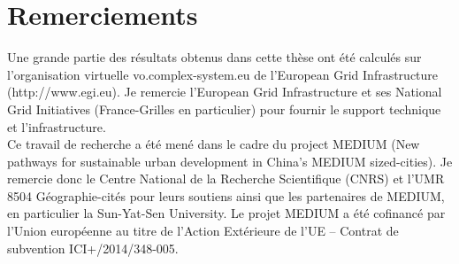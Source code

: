 




\begingroup

\let\clearpage\relax
\let\cleardoublepage\relax
\let\cleardoublepage\relax

\chapter*{Remerciements}




Une grande partie des résultats obtenus dans cette thèse ont été calculés sur l'organisation virtuelle vo.complex-system.eu de l'European Grid Infrastructure (http://www.egi.eu). Je remercie l'European Grid Infrastructure et ses National Grid Initiatives (France-Grilles en particulier) pour fournir le support technique et l'infrastructure. \\


Ce travail de recherche a été mené dans le cadre du project MEDIUM (New pathways for sustainable urban development in China’s MEDIUM sized-cities). Je remercie donc le Centre National de la Recherche Scientifique (CNRS) et l’UMR 8504 Géographie-cités pour leurs soutiens ainsi que les partenaires de MEDIUM, en particulier la Sun-Yat-Sen University. Le projet MEDIUM a été cofinancé par l’Union européenne au titre de l’Action Extérieure de l’UE – Contrat de subvention ICI+/2014/348-005.\\


